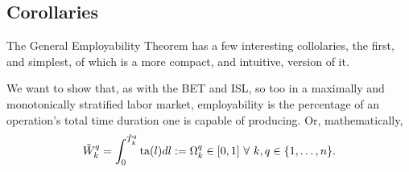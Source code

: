 \documentclass[hidelinks, nonatbib]{elsarticle}
\begin{document}
\subsection{Corollaries}
The General Employability Theorem has a few interesting collolaries, the first, and simplest, of which is a more compact, and intuitive, version of it.
\begin{corollary}
    We want to show that, as with the BET and ISL, so too in a maximally and monotonically stratified labor market, employability is the percentage of an operation's total time duration one is capable of producing. Or, mathematically,
    \begin{gather}
        \tilde{W}_{k}^{q}
        =
        \int_{0}^{\tilde{T}_{k}^{q}}
        \text{ta}(l)
        dl
        :=
        \Omega_{k}^{q}
        \in 
        [0,1]
        \
        \forall
        \
        k,q \in \{1, \dots, n\}
        .
    \end{gather}


\end{corollary}
\end{document}
